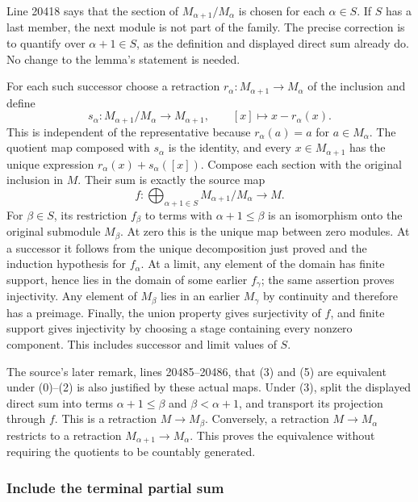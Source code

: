 Line 20418 says that the section of \(M_{\alpha+1}/M_\alpha\) is chosen for each \(\alpha\in S\). If \(S\) has a last member, the next module is not part of the family. The precise correction is to quantify over \(\alpha+1\in S\), as the definition and displayed direct sum already do. No change to the lemma's statement is needed.

For each such successor choose a retraction \(r_\alpha:M_{\alpha+1}\to M_\alpha\) of the inclusion and define \[
s_\alpha:M_{\alpha+1}/M_\alpha\longrightarrow M_{\alpha+1},
\qquad [x]\longmapsto x-r_\alpha(x).
\] This is independent of the representative because \(r_\alpha(a)=a\) for \(a\in M_\alpha\). The quotient map composed with \(s_\alpha\) is the identity, and every \(x\in M_{\alpha+1}\) has the unique expression \(r_\alpha(x)+s_\alpha([x])\). Compose each section with the original inclusion in \(M\). Their sum is exactly the source map \[
f:\bigoplus_{\alpha+1\in S}M_{\alpha+1}/M_\alpha\longrightarrow M.
\] For \(\beta\in S\), its restriction \(f_\beta\) to terms with \(\alpha+1\leq\beta\) is an isomorphism onto the original submodule \(M_\beta\). At zero this is the unique map between zero modules. At a successor it follows from the unique decomposition just proved and the induction hypothesis for \(f_\alpha\). At a limit, any element of the domain has finite support, hence lies in the domain of some earlier \(f_\gamma\); the same assertion proves injectivity. Any element of \(M_\beta\) lies in an earlier \(M_\gamma\) by continuity and therefore has a preimage. Finally, the union property gives surjectivity of \(f\), and finite support gives injectivity by choosing a stage containing every nonzero component. This includes successor and limit values of \(S\).

The source's later remark, lines 20485--20486, that (3) and (5) are equivalent under (0)--(2) is also justified by these actual maps. Under (3), split the displayed direct sum into terms \(\alpha+1\leq\beta\) and \(\beta<\alpha+1\), and transport its projection through \(f\). This is a retraction \(M\to M_\beta\). Conversely, a retraction \(M\to M_\alpha\) restricts to a retraction \(M_{\alpha+1}\to M_\alpha\). This proves the equivalence without requiring the quotients to be countably generated.

\subsubsection{Include the terminal partial sum}\label{algebra-proof-011-include-the-terminal-partial-sum}

